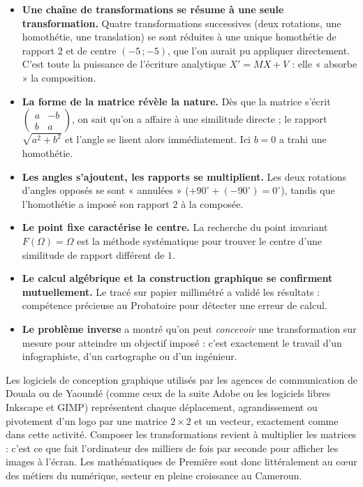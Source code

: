 \documentclass[11pt]{article}
\begin{document}
\begin{itemize}
\item \textbf{Une chaîne de transformations se résume à une seule transformation.} Quatre transformations successives (deux rotations, une homothétie, une translation) se sont réduites à une unique homothétie de rapport $2$ et de centre $(-5\,;-5)$, que l'on aurait pu appliquer directement. C'est toute la puissance de l'écriture analytique $X' = MX + V$ : elle « absorbe » la composition.
\item \textbf{La forme de la matrice révèle la nature.} Dès que la matrice s'écrit $\begin{pmatrix} a & -b \\ b & a \end{pmatrix}$, on sait qu'on a affaire à une similitude directe ; le rapport $\sqrt{a^2+b^2}$ et l'angle se lisent alors immédiatement. Ici $b = 0$ a trahi une homothétie.
\item \textbf{Les angles s'ajoutent, les rapports se multiplient.} Les deux rotations d'angles opposés se sont « annulées » ($+90^\circ + (-90^\circ) = 0^\circ$), tandis que l'homothétie a imposé son rapport $2$ à la composée.
\item \textbf{Le point fixe caractérise le centre.} La recherche du point invariant $F(\Omega) = \Omega$ est la méthode systématique pour trouver le centre d'une similitude de rapport différent de $1$.
\item \textbf{Le calcul algébrique et la construction graphique se confirment mutuellement.} Le tracé sur papier millimétré a validé les résultats : compétence précieuse au Probatoire pour détecter une erreur de calcul.
\item \textbf{Le problème inverse} a montré qu'on peut \emph{concevoir} une transformation sur mesure pour atteindre un objectif imposé : c'est exactement le travail d'un infographiste, d'un cartographe ou d'un ingénieur.
\end{itemize}

\begin{savaistu}
Les logiciels de conception graphique utilisés par les agences de communication de Douala ou de Yaoundé (comme ceux de la suite Adobe ou les logiciels libres Inkscape et GIMP) représentent chaque déplacement, agrandissement ou pivotement d'un logo par une matrice $2\times 2$ et un vecteur, exactement comme dans cette activité. Composer les transformations revient à multiplier les matrices : c'est ce que fait l'ordinateur des milliers de fois par seconde pour afficher les images à l'écran. Les mathématiques de Première sont donc littéralement au cœur des métiers du numérique, secteur en pleine croissance au Cameroun.
\end{savaistu}
\end{document}
